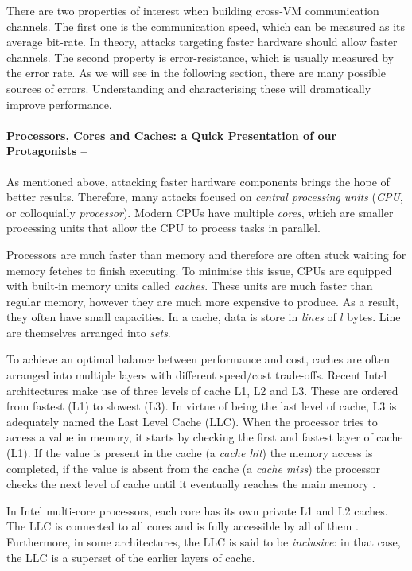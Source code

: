 \documentclass[orivec,envcountsame, a4paper, 11pt]{llncs}
\begin{document}
There are two properties of interest when building cross-VM communication channels. The first one is the communication speed, which can be measured as its average bit-rate. In theory, attacks targeting faster hardware should allow faster channels. The second property is error-resistance, which is usually measured by the error rate. As we will see in the following section, there are many possible sources of errors. Understanding and characterising these will dramatically improve performance.

\paragraph{Processors, Cores and Caches: a Quick Presentation of our Protagonists --} As mentioned above, attacking faster hardware components brings the hope of better results. Therefore, many attacks focused on \textit{central processing units} (\textit{CPU}, or colloquially \textit{processor}). Modern CPUs have multiple \textit{cores}, which are smaller processing units that allow the CPU to process tasks in parallel. 

Processors are much faster than memory and therefore are often stuck waiting for memory fetches to finish executing. To minimise this issue, CPUs are equipped with built-in memory units called \textit{caches}. These units are much faster than regular memory, however they are much more expensive to produce. As a result, they often have small capacities. In a cache, data is store in \textit{lines} of $l$ bytes. Line are themselves arranged into \textit{sets}.

To achieve an optimal balance between performance and cost, caches are often arranged into multiple layers with different speed/cost trade-offs. Recent Intel architectures make use of three levels of cache L1, L2 and L3. These are ordered from fastest (L1) to slowest (L3). In virtue of being the last level of cache, L3 is adequately named the Last Level Cache (LLC). When the processor tries to access a value in memory, it starts by checking the first and fastest layer of cache (L1). If the value is present in the cache (a \textit{cache hit}) the memory access is completed, if the value is absent from the cache (a \textit{cache miss}) the processor checks the next level of cache until it eventually reaches the main memory \cite{Maurice2015}.

In Intel multi-core processors, each core has its own private L1 and L2 caches. The LLC is connected to all cores and is fully accessible by all of them \cite{Maurice2015}. Furthermore, in some architectures, the LLC is said to be \textit{inclusive}: in that case, the LLC is a superset of the earlier layers of cache.
\end{document}
